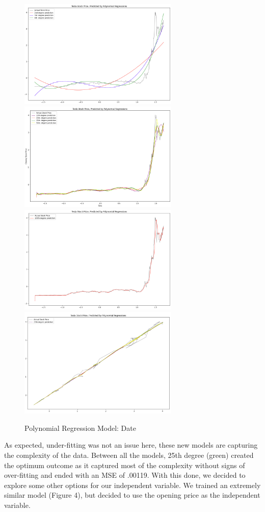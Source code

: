 \documentclass[12pt,a4paper]{article}
\begin{document}
\begin{figure}[h]
\caption{Polynomial Regression Model: Date}
\centering
\includegraphics[width=3in]{./Figures/PolyRegression1.png}
\includegraphics[width=3in]{./Figures/PolyRegression2.png}
\includegraphics[width=3in]{./Figures/PolyRegression3.png}
\includegraphics[width=3in]{./Figures/PolyRegression4.png}
\end{figure}

As expected, under-fitting was not an issue here, these new models are capturing the complexity of the data. Between all the models, 25th degree (green) created the optimum outcome as it captured most of the complexity without signs of over-fitting and ended with an MSE of .00119.
With this done, we decided to explore some other options for our independent variable. We trained an extremely similar model (Figure 4), but decided to use the opening price as the independent variable.
\end{document}
